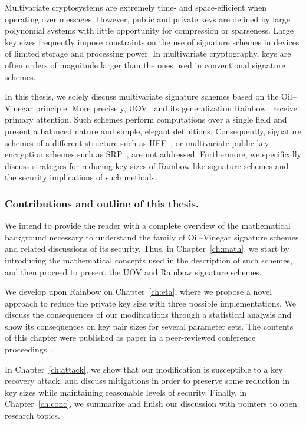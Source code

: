 \documentclass[12pt, a4paper, oneside]{memoir}
\theoremstyle{definition}
\begin{document}
Multivariate cryptosystems are extremely time- and space-efficient when operating over messages. However, public and private keys are defined by large polynomial systems with little opportunity for compression or sparseness. Large key sizes frequently impose constraints on the use of signature schemes in devices of limited storage and processing power. In multivariate cryptography, keys are often orders of magnitude larger than the ones used in conventional signature schemes.

In this thesis, we solely discuss multivariate signature schemes based on the Oil--Vinegar principle. More precisely, UOV~\cite{Kipnis:199904} and its generalization Rainbow~\cite{Ding:200506} receive primary attention. Such schemes perform computations over a single field and present a balanced nature and simple, elegant definitions. Consequently, signature schemes of a different structure such as HFE~\cite{Patarin:199605}, or multivariate public-key encryption schemes such as SRP~\cite{Duong:201607}, are not addressed. Furthermore, we specifically discuss strategies for reducing key sizes of Rainbow-like signature schemes and the security implications of such methods.

\subsubsection{Contributions and outline of this thesis.}

We intend to provide the reader with a complete overview of the mathematical background necessary to understand the family of Oil--Vinegar signature schemes and related discussions of its security. Thus, in Chapter~\ref{ch:math}, we start by introducing the mathematical concepts used in the description of such schemes, and then proceed to present the UOV and Rainbow signature schemes. 

We develop upon Rainbow on Chapter~\ref{ch:eta}, where we propose a novel approach to reduce the private key size with three possible implementations. We discuss the consequences of our modifications through a statistical analysis and show its consequences on key pair sizes for several parameter sets. The contents of this chapter were published as paper in a peer-reviewed conference proceedings~\cite{Zambonin:201907}. 

In Chapter~\ref{ch:attack}, we show that our modification is susceptible to a key recovery attack, and discuss mitigations in order to preserve some reduction in key sizes while maintaining reasonable levels of security. Finally, in Chapter~\ref{ch:conc}, we summarize and finish our discussion with pointers to open research topics.
\end{document}

